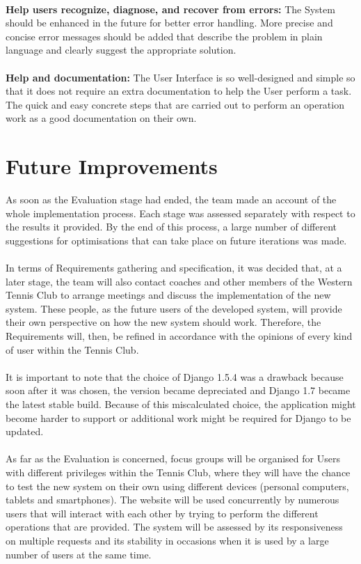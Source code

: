 \documentclass{l3proj}
\begin{document}
 \\
\textbf{Help users recognize, diagnose, and recover from errors:}
The System should be enhanced in the future for better error handling. More precise and concise error messages should be added that describe the problem in plain language and clearly suggest the appropriate solution.\\
 \\
\textbf{Help and documentation:}
The User Interface is so well-designed and simple so that it does not require an extra documentation to help the User perform a task. The quick and easy concrete steps that are carried out to perform an operation work as a good documentation on their own.\\

\section{Future Improvements}
As soon as the Evaluation stage had ended, the team made an account of the whole implementation process. Each stage was assessed separately with respect to the results it provided. By the end of this process, a large number of different suggestions for optimisations that can take place on future iterations was made.\\
\\ In terms of Requirements gathering and specification, it was decided that, at a later stage, the team will also contact coaches and other members of the Western Tennis Club to arrange meetings and discuss the implementation of the new system. These people, as the future users of the developed system, will provide their own perspective on how the new system should work. Therefore, the Requirements will, then, be refined in accordance with the opinions of every kind of user within the Tennis Club.\\
\\ It is important to note that the choice of Django 1.5.4 was a drawback because soon after it was chosen, the version became depreciated and Django 1.7 became the latest stable build. Because of this miscalculated choice, the application might become harder to support or additional work might be required for Django to be updated.\\
\\ As far as the Evaluation is concerned, focus groups will be organised for Users with different privileges within the Tennis Club, where they will have the chance to test the new system on their own using different devices (personal computers, tablets and smartphones). The website will be used concurrently by numerous users that will interact with each other by trying to perform the different operations that are provided.  The system will be assessed by its responsiveness on multiple requests and its stability in occasions when it is used by a large number of users at the same time.
\end{document}
